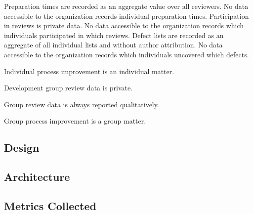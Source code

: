       Preparation times are recorded as an aggregate value over all reviewers. No data
      accessible to the organization records individual preparation times. 
      Participation in reviews is private data. No data accessible to the organization records
      which individuals participated in which reviews. 
      Defect lists are recorded as an aggregate of all individual lists and without author
      attribution. No data accessible to the organization records which individuals uncovered
      which defects. 

Individual process improvement is an individual matter.

Development group review data is private.


Group review data is always reported qualitatively.


Group process improvement is a group matter.




\subsection{Design}

\subsection{Architecture}

\subsection{Metrics Collected}